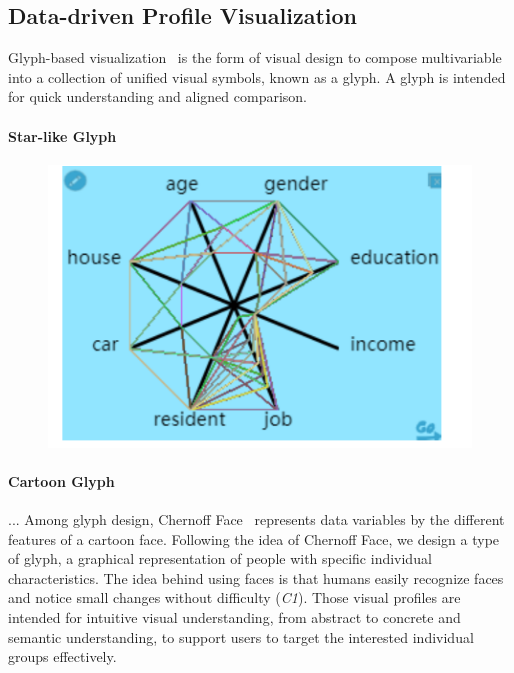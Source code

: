 \subsection{Data-driven Profile Visualization}

Glyph-based visualization~\cite{borgo2013glyph} is the form of visual design to compose multivariable into a collection of unified visual symbols, known as a glyph. A glyph is intended for quick understanding and aligned comparison. 

\paragraph{Star-like Glyph} 

\begin{figure}[htb!]
 \centering %
 \includegraphics[width=\linewidth]{pictures/star53}
 \caption{}
 \label{fig:interfaceDraft}
\end{figure}

\paragraph{Cartoon Glyph} ... Among glyph design, Chernoff Face~\cite{chernoff1973use} represents data variables by the different features of a cartoon face. Following the idea of Chernoff Face, we design a type of glyph, a graphical representation of people with specific individual characteristics. The idea behind using faces is that humans easily recognize faces and notice small changes without difficulty (\textit{C1}). Those visual profiles are intended for intuitive visual understanding, from abstract to concrete and semantic understanding, to support users to target the interested individual groups effectively.

